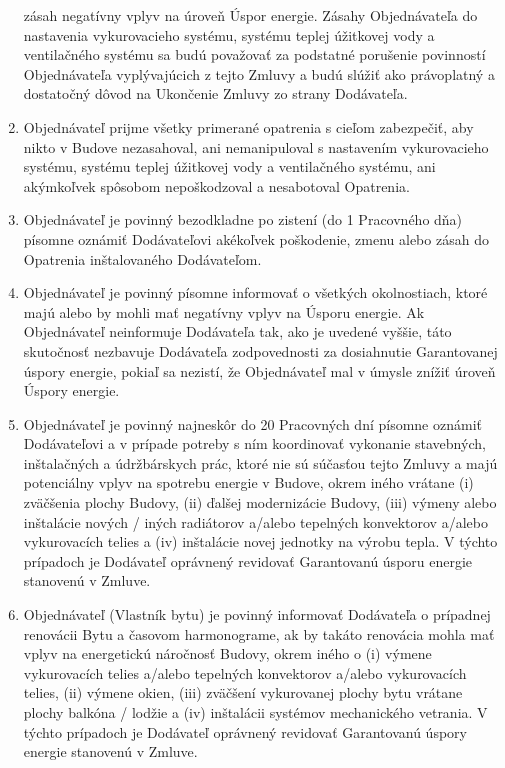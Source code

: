 \begin{multicols}{2}
\begin{enumerate}
  zásah negatívny vplyv na úroveň Úspor energie. Zásahy Objednávateľa do
  nastavenia vykurovacieho systému, systému teplej úžitkovej vody a
  ventilačného systému sa budú považovať za podstatné porušenie
  povinností Objednávateľa vyplývajúcich z tejto Zmluvy a budú slúžiť
  ako právoplatný a dostatočný dôvod na Ukončenie Zmluvy zo strany
  Dodávateľa.
\item
  Objednávateľ prijme všetky primerané opatrenia s cieľom zabezpečiť,
  aby nikto v Budove nezasahoval, ani nemanipuloval s nastavením
  vykurovacieho systému, systému teplej úžitkovej vody a ventilačného
  systému, ani akýmkoľvek spôsobom nepoškodzoval a nesabotoval
  Opatrenia.
\item
  Objednávateľ je povinný bezodkladne po zistení (do 1 Pracovného dňa)
  písomne oznámiť Dodávateľovi akékoľvek poškodenie, zmenu alebo zásah
  do Opatrenia inštalovaného Dodávateľom.
\item
  Objednávateľ je povinný písomne informovať o všetkých okolnostiach,
  ktoré majú alebo by mohli mať negatívny vplyv na Úsporu energie. Ak
  Objednávateľ neinformuje Dodávateľa tak, ako je uvedené vyššie, táto
  skutočnosť nezbavuje Dodávateľa zodpovednosti za dosiahnutie
  Garantovanej úspory energie, pokiaľ sa nezistí, že Objednávateľ mal v
  úmysle znížiť úroveň Úspory energie.
\item
  Objednávateľ je povinný najneskôr do 20 Pracovných dní písomne oznámiť
  Dodávateľovi a v prípade potreby s ním koordinovať vykonanie
  stavebných, inštalačných a údržbárskych prác, ktoré nie sú súčasťou
  tejto Zmluvy a majú potenciálny vplyv na spotrebu energie v Budove,
  okrem iného vrátane (i) zväčšenia plochy Budovy, (ii) ďalšej
  modernizácie Budovy, (iii) výmeny alebo inštalácie nových / iných
  radiátorov a/alebo tepelných konvektorov a/alebo vykurovacích telies a
  (iv) inštalácie novej jednotky na výrobu tepla. V týchto prípadoch je
  Dodávateľ oprávnený revidovať Garantovanú úsporu energie stanovenú v
  Zmluve.
\item
  Objednávateľ (Vlastník bytu) je povinný informovať Dodávateľa o
  prípadnej renovácii Bytu a časovom harmonograme, ak by takáto
  renovácia mohla mať vplyv na energetickú náročnosť Budovy, okrem iného
  o (i) výmene vykurovacích telies a/alebo tepelných konvektorov a/alebo
  vykurovacích telies, (ii) výmene okien, (iii) zväčšení vykurovanej
  plochy bytu vrátane plochy balkóna / lodžie a (iv) inštalácii systémov
  mechanického vetrania. V týchto prípadoch je Dodávateľ oprávnený
  revidovať Garantovanú úspory energie stanovenú v Zmluve.

\end{enumerate}
\end{multicols}
